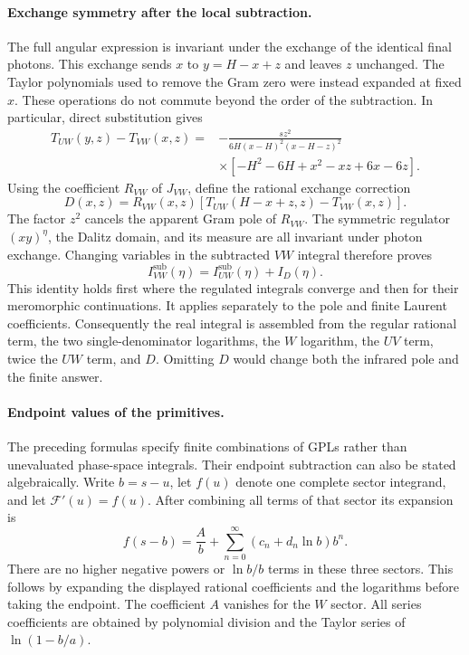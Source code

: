 \paragraph{Exchange symmetry after the local subtraction.}
The full angular expression is invariant under the exchange of the
identical final photons. This exchange sends $x$ to $y=H-x+z$ and
leaves $z$ unchanged. The Taylor polynomials used to remove the Gram
zero were instead expanded at fixed $x$. These operations do not
commute beyond the order of the subtraction. In particular, direct
substitution gives
\begin{equation}
 \begin{split}
 T_{UW}(y,z)-T_{VW}(x,z)
 ={}&-\frac{s z^2}{6H(x-H)^2(x-H-z)^2}\\
 &\times[-H^2-6H+x^2-xz+6x-6z].
 \end{split}
\end{equation}
Using the coefficient $R_{VW}$ of $J_{VW}$, define the rational
exchange correction
\begin{equation}
 D(x,z)=R_{VW}(x,z)[T_{UW}(H-x+z,z)-T_{VW}(x,z)].
\end{equation}
The factor $z^2$ cancels the apparent Gram pole of $R_{VW}$.
The symmetric regulator $(xy)^\eta$, the Dalitz domain, and its
measure are all invariant under photon exchange. Changing variables
in the subtracted $VW$ integral therefore proves
\begin{equation}
 I_{VW}^{\mathrm{sub}}(\eta)
 =I_{UW}^{\mathrm{sub}}(\eta)+I_D(\eta).
\end{equation}
This identity holds first where the regulated integrals converge
and then for their meromorphic continuations. It applies separately
to the pole and finite Laurent coefficients. Consequently the real
integral is assembled from the regular rational term, the two
single-denominator logarithms, the $W$ logarithm, the $UV$ term,
twice the $UW$ term, and $D$. Omitting $D$ would change both the
infrared pole and the finite answer.

\paragraph{Endpoint values of the primitives.}
The preceding formulas specify finite combinations of GPLs rather
than unevaluated phase-space integrals. Their endpoint subtraction
can also be stated algebraically. Write $b=s-u$, let $f(u)$ denote
one complete sector integrand, and let $\mathcal F'(u)=f(u)$.
After combining all terms of that sector its expansion is
\begin{equation}
 f(s-b)=\frac{A}{b}
   +\sum_{n=0}^{\infty}(c_n+d_n\ln b)b^n.
 \label{eq:comp-real-endpoint-series}
\end{equation}
There are no higher negative powers or $\ln b/b$ terms in these
three sectors. This follows by expanding the displayed rational
coefficients and the logarithms before taking the endpoint. The
coefficient $A$ vanishes for the $W$ sector. All series coefficients
are obtained by polynomial division and the Taylor series of
$\ln(1-b/a)$.

